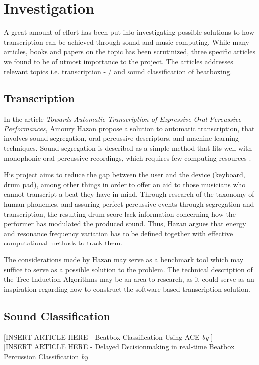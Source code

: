 \section{Investigation}
A great amount of effort has been put into investigating possible solutions to how transcription can be achieved through sound and music computing. While many articles, books and papers on the topic has been scrutinized, three specific articles we found to be of utmost importance to the project. The articles addresses relevant topics i.e. transcription - / and sound classification of beatboxing.

\subsection{Transcription}
In the article \textit{Towards Automatic Transcription of Expressive Oral Percussive Performances}, Amoury Hazan propose a solution to automatic transcription, that involves sound segregation, oral percussive descriptors, and machine learning techniques. Sound segregation is described as a simple method that fits well with monophonic oral percussive recordings, which requires few computing resources \citep{Hazan2005a}.	

His project aims to reduce the gap between the user and the device (keyboard, drum pad), among other things in order to offer an aid to those musicians who cannot transcript a beat they have in mind.
Through research of the taxonomy of human phonemes, and assuring perfect percussive events through segregation and transcription, the resulting drum score lack information concerning how the performer has modulated the produced sound. Thus, Hazan argues that energy and resonance frequency variation has to be defined together with effective computational methods to track them.
	
The considerations made by Hazan may serve as a benchmark tool which may suffice to serve as a possible solution to the problem. The technical description of the Tree Induction Algorithms may be an area to research, as it could serve as an inspiration regarding how to construct the software based transcription-solution.

\subsection{Sound Classification}

[INSERT ARTICLE HERE - Beatbox Classification Using ACE \textit{by} \citep{Sinyor05} ]
\\

[INSERT ARTICLE HERE - Delayed Decisionmaking in real-time Beatbox Percussion Classification \textit{by} \citep{Stowell2010} ]
